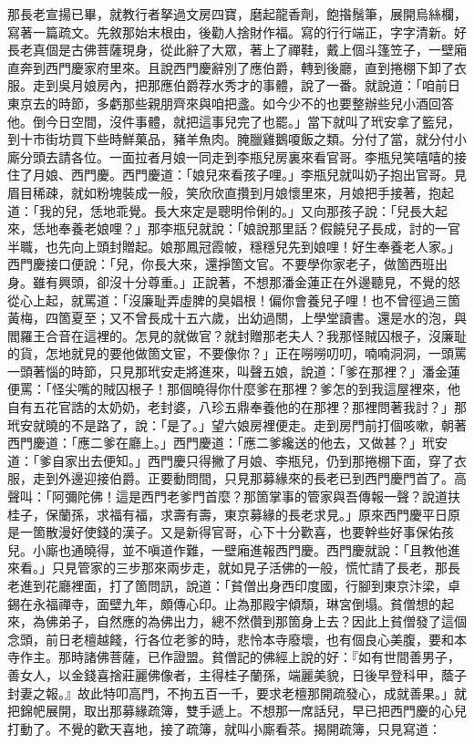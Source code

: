 那長老宣揚已畢，就教行者拏過文房四寶，磨起龍香劑，飽揝鬚筆，展開烏絲欄，寫著一篇疏文。先敘那始末根由，後勸人捨財作福。寫的行行端正，字字清新。好長老真個是古佛菩薩現身，從此辭了大眾，著上了禪鞋，戴上個斗篷笠子，一壁廂直奔到西門慶家府里來。且說西門慶辭別了應伯爵，轉到後廳，直到捲棚下卸了衣服。走到吳月娘房內，把那應伯爵荐水秀才的事體，說了一番。就說道：「咱前日東京去的時節，多虧那些親朋齊來與咱把盞。如今少不的也要整辦些兒小酒回答他。倒今日空間，沒件事體，就把這事兒完了也罷。」當下就叫了玳安拿了籃兒，到十市街坊買下些時鮮菓品，豬羊魚肉。腌臘雞鵝嗄飯之類。分付了當，就分付小廝分頭去請各位。一面拉者月娘一同走到李瓶兒房裏來看官哥。李瓶兒笑嘻嘻的接住了月娘、西門慶。西門慶道：「娘兒來看孩子哩。」李瓶兒就叫奶子抱出官哥。見眉目稀疎，就如粉塊裝成一般，笑欣欣直攢到月娘懷里來，月娘把手接著，抱起道：「我的兒，恁地乖覺。長大來定是聰明伶俐的。」又向那孩子說：「兒長大起來，恁地奉養老娘哩？」那李瓶兒就說：「娘說那里話？假饒兒子長成，討的一官半職，也先向上頭封贈起。娘那鳳冠霞帔，穩穩兒先到娘哩！好生奉養老人家。」西門慶接口便說：「兒，你長大來，還掙箇文官。不要學你家老子，做箇西班出身。雖有興頭，卻沒十分尊重。」正說著，不想那潘金蓮正在外邊聽見，不覺的怒從心上起，就罵道：「沒廉耻弄虛脾的臭娼根！偏你會養兒子哩！也不曾徑過三箇黃梅，四箇夏至；又不曾長成十五六歲，出幼過關，上學堂讀書。還是水的泡，與閻羅王合音在這裡的。怎見的就做官？就封贈那老夫人？我那怪賊囚根子，沒廉耻的貨，怎地就見的要他做箇文宦，不要像你？」正在嘮嘮叨叨，喃喃洞洞，一頭罵一頭著惱的時節，只見那玳安走將進來，叫聲五娘，說道：「爹在那裡？」潘金蓮便罵：「怪尖嘴的賊囚根子！那個曉得你什麼爹在那裡？爹怎的到我這屋裡來，他自有五花官誥的太奶奶，老封婆，八珍五鼎奉養他的在那裡？那裡問著我討？」那玳安就曉的不是路了，說：「是了。」望六娘房裡便走。走到房門前打個咳嗽，朝著西門慶道：「應二爹在廳上。」西門慶道：「應二爹纔送的他去，又做甚？」玳安道：「爹自家出去便知。」西門慶只得撇了月娘、李瓶兒，仍到那捲棚下面，穿了衣服，走到外邊迎接伯爵。正要動問間，只見那募緣來的長老已到西門慶門首了。高聲叫：「阿彌陀佛！這是西門老爹門首麼？那箇掌事的管家與吾傳報一聲？說道扶桂子，保蘭孫，求福有福，求壽有壽，東京募緣的長老求見。」原來西門慶平日原是一箇散漫好使錢的漢子。又是新得官哥，心下十分歡喜，也要幹些好事保佑孩兒。小廝也通曉得，並不嗔道作難，一壁廂進報西門慶。西門慶就說：「且教他進來看。」只見管家的三步那來兩步走，就如見子活佛的一般，慌忙請了長老，那長老進到花廳裡面，打了箇問訊，說道：「貧僧出身西印度國，行腳到東京汴梁，卓錫在永福禪寺，面壁九年，頗傳心印。止為那殿宇傾頹，琳宮倒塌。貧僧想的起來，為佛弟子，自然應的為佛出力，總不然儹到那箇身上去？因此上貧僧發了這個念頭，前日老檀越餞，行各位老爹的時，悲怜本寺廢壞，也有個良心美腹，要和本寺作主。那時諸佛菩薩，已作證盟。貧僧記的佛經上說的好：『如有世間善男子，善女人，以金錢喜捨莊麗佛像者，主得桂子蘭孫，端麗美貌，日後早登科甲，蔭子封妻之報。』故此特叩高門，不拘五百一千，要求老檀那開疏發心，成就善果。」就把錦帊展開，取出那募緣疏簿，雙手遞上。不想那一席話兒，早已把西門慶的心兒打動了。不覺的歡天喜地，接了疏簿，就叫小廝看茶。揭開疏簿，只見寫道：

